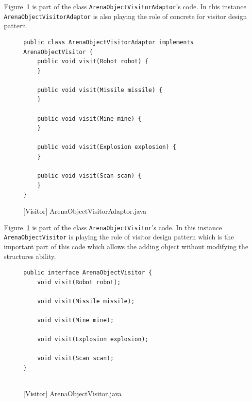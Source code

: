 Figure~\ref{fig:ArenaObjectVisitorAdaptor} is part of the class \texttt{ArenaObjectVisitorAdaptor}'s code. In this instance \texttt{ArenaObjectVisitorAdaptor} is also playing the role of concrete for visitor design pattern. 

\begin{figure}[htb]
\centering
\lstset{language=Java, basicstyle=\scriptsize, stepnumber=1, showspaces=false, showstringspaces=false,breaklines=true}
\begin{lstlisting}
public class ArenaObjectVisitorAdaptor implements ArenaObjectVisitor {
    public void visit(Robot robot) {
    }

    public void visit(Missile missile) {
    }

    public void visit(Mine mine) {
    }

    public void visit(Explosion explosion) {
    }

    public void visit(Scan scan) {
    }
}

\end{lstlisting}
\caption{[Visitor] ArenaObjectVisitorAdaptor.java}
\label{fig:ArenaObjectVisitorAdaptor}
\end{figure}
\FloatBarrier

Figure~\ref{fig:ArenaObjectVisitorAdaptor} is part of the class \texttt{ArenaObjectVisitor}'s code. In this instance \texttt{ArenaObjectVisitor} is playing the role of visitor design pattern which is the important part of this code which allows the adding object without modifying the structures ability. 
\begin{figure}[htb]
\centering
\lstset{language=Java, basicstyle=\scriptsize, stepnumber=1, showspaces=false, showstringspaces=false,breaklines=true}
\begin{lstlisting}
public interface ArenaObjectVisitor {
    void visit(Robot robot);

    void visit(Missile missile);

    void visit(Mine mine);

    void visit(Explosion explosion);

    void visit(Scan scan);
}


\end{lstlisting}
\caption{[Visitor] ArenaObjectVisitor.java}
\label{fig:ArenaObjectVisitor}
\end{figure}
\FloatBarrier

